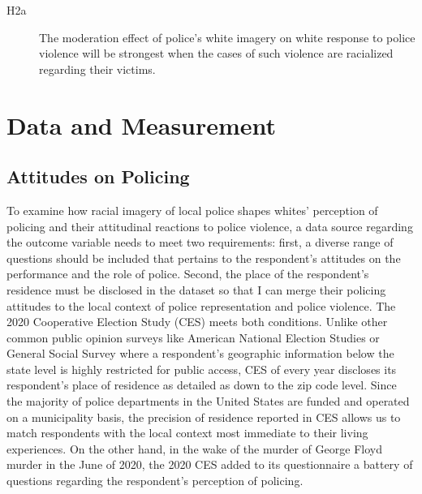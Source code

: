 \documentclass[
  12pt,
]{article}
\begin{document}
\begin{description}
\item[H2a]
The moderation effect of police's white imagery on white response to
police violence will be strongest when the cases of such violence are
racialized regarding their victims.
\end{description}

\hypertarget{data-and-measurement}{%
\section{Data and Measurement}\label{data-and-measurement}}

\hypertarget{attitudes-on-policing}{%
\subsection{Attitudes on Policing}\label{attitudes-on-policing}}

To examine how racial imagery of local police shapes whites' perception
of policing and their attitudinal reactions to police violence, a data
source regarding the outcome variable needs to meet two requirements:
first, a diverse range of questions should be included that pertains to
the respondent's attitudes on the performance and the role of police.
Second, the place of the respondent's residence must be disclosed in the
dataset so that I can merge their policing attitudes to the local
context of police representation and police violence. The 2020
Cooperative Election Study (CES) meets both conditions. Unlike other
common public opinion surveys like American National Election Studies or
General Social Survey where a respondent's geographic information below
the state level is highly restricted for public access, CES of every
year discloses its respondent's place of residence as detailed as down
to the zip code level. Since the majority of police departments in the
United States are funded and operated on a municipality basis, the
precision of residence reported in CES allows us to match respondents
with the local context most immediate to their living experiences. On
the other hand, in the wake of the murder of George Floyd murder in the
June of 2020, the 2020 CES added to its questionnaire a battery of
questions regarding the respondent's perception of policing.
\end{document}
